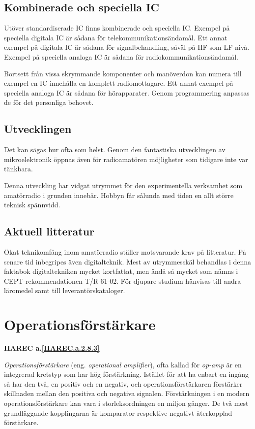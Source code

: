 \subsection{Kombinerade och speciella IC}

Utöver standardiserade IC finns kombinerade och speciella IC. Exempel på speciella digitala IC är sådana för telekommunikationsändamål. Ett annat exempel på digitala IC är sådana för signalbehandling, såväl på HF som LF-nivå. Exempel på speciella analoga IC är sådana för radiokommunikationsändamål.

Bortsett från vissa skrymmande komponenter och manöverdon kan numera till exempel en
IC innehålla en komplett radiomottagare. Ett annat exempel på speciella analoga IC är sådana för hörapparater. Genom programmering anpassas de för det personliga behovet.

\subsection{Utvecklingen}

Det kan sägas hur ofta som helst. Genom den fantastiska utvecklingen av mikroelektronik öppnas även för radioamatören möjligheter som tidigare inte var tänkbara.

Denna utveckling har vidgat utrymmet för den experimentella verksamhet som amatörradio i grunden innebär. Hobbyn får sålunda med tiden en allt större teknisk spännvidd.

\subsection{Aktuell litteratur}

Ökat teknikomfång inom amatörradio ställer motsvarande krav på litteratur. På senare tid inbegripes även digitalteknik. Mest av utrymmesskäl behandlas i denna faktabok digitaltekniken mycket kortfattat, men ändå så mycket som nämns i CEPT-rekommendationen T/R 61-02. För djupare studium hänvisas till andra läromedel samt till leverantörskataloger.

\section{Operationsförstärkare}
\textbf{
HAREC a.\ref{HAREC.a.2.8.3}\label{myHAREC.a.2.8.3}
}

\emph{Operationsförstärkare} (eng. \emph{operational amplifier}), ofta kallad
för \emph{op-amp} är en integrerad kretstyp som har hög förstärkning.
Istället för att ha enbart en ingång så har den två, en positiv
och en negativ, och operationsförstärkaren förstärker skillnaden mellan den
positiva och negativa signalen. Förstärkningen i en modern operationsförstärkare
kan vara i storleksordningen en miljon gånger.
De två mest grundläggande kopplingarna är komparator respektive negativt återkopplad förstärkare.

